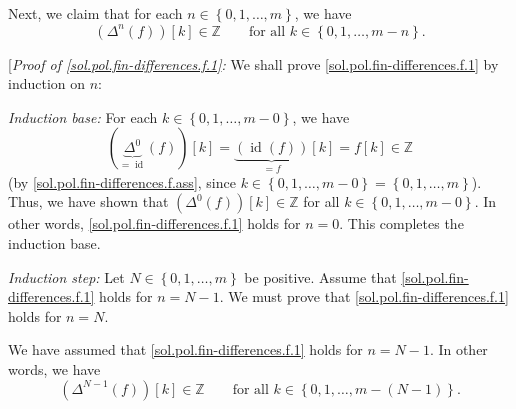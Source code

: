 \documentclass[paper=a4, fontsize=12pt]{scrartcl}%
\theoremstyle{plainsl}
\theoremstyle{definition}
\theoremstyle{remark}
\begin{document}
Next, we claim that for each $n\in\left\{  0,1,\ldots,m\right\}  $, we have%
\begin{equation}
\left(  \Delta^{n}\left(  f\right)  \right)  \left[  k\right]  \in
\mathbb{Z}\qquad\text{for all }k\in\left\{  0,1,\ldots,m-n\right\}  .
\label{sol.pol.fin-differences.f.1}%
\end{equation}


[\textit{Proof of \eqref{sol.pol.fin-differences.f.1}:} We shall prove
\eqref{sol.pol.fin-differences.f.1} by induction on $n$:

\textit{Induction base:} For each $k\in\left\{  0,1,\ldots,m-0\right\}  $, we
have
\[
\left(  \underbrace{\Delta^{0}}_{=\operatorname*{id}}\left(  f\right)
\right)  \left[  k\right]  =\underbrace{\left(  \operatorname*{id}\left(
f\right)  \right)  }_{=f}\left[  k\right]  =f\left[  k\right]  \in\mathbb{Z}%
\]
(by \eqref{sol.pol.fin-differences.f.ass}, since $k\in\left\{  0,1,\ldots
,m-0\right\}  =\left\{  0,1,\ldots,m\right\}  $). Thus, we have shown that
$\left(  \Delta^{0}\left(  f\right)  \right)  \left[  k\right]  \in\mathbb{Z}$
for all $k\in\left\{  0,1,\ldots,m-0\right\}  $. In other words,
\eqref{sol.pol.fin-differences.f.1} holds for $n=0$. This completes the
induction base.

\textit{Induction step:} Let $N\in\left\{  0,1,\ldots,m\right\}  $ be
positive. Assume that \eqref{sol.pol.fin-differences.f.1} holds for $n=N-1$.
We must prove that \eqref{sol.pol.fin-differences.f.1} holds for $n=N$.

We have assumed that \eqref{sol.pol.fin-differences.f.1} holds for $n=N-1$. In
other words, we have%
\begin{equation}
\left(  \Delta^{N-1}\left(  f\right)  \right)  \left[  k\right]  \in
\mathbb{Z}\qquad\text{for all }k\in\left\{  0,1,\ldots,m-\left(  N-1\right)
\right\}  . \label{sol.pol.fin-differences.f.1.pf.IH}%
\end{equation}
\end{document}

